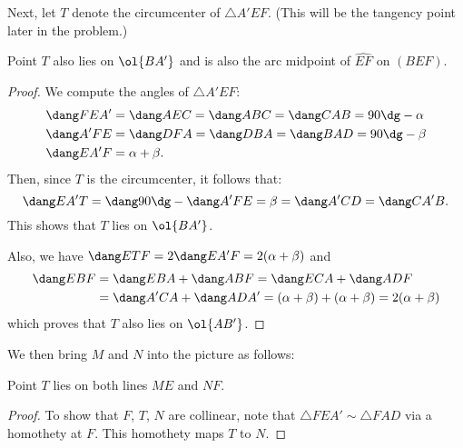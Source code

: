 \documentclass[11pt]{scrartcl}
\begin{document}
Next, let $T$ denote the circumcenter of $\triangle A'EF$.
(This will be the tangency point later in the problem.)
\begin{claim*}
  Point $T$ also lies on $\ol{BA'}$ and is also the arc midpoint of $\widehat{EF}$ on $(BEF)$.
\end{claim*}
\begin{proof}
  We compute the angles of $\triangle A'EF$:
  \begin{align*}
    \dang FEA' &= \dang AEC = \dang ABC = \dang CAB = 90\dg - \alpha \\
    \dang A'FE &= \dang DFA = \dang DBA = \dang BAD = 90\dg - \beta \\
    \dang EA'F &= \alpha + \beta.
  \end{align*}
  Then, since $T$ is the circumcenter, it follows that:
  \[ \dang EA'T = \dang 90\dg - \dang A'FE = \beta = \dang A'CD = \dang CA'B. \]
  This shows that $T$ lies on $\ol{BA'}$.

  Also, we have $\dang ETF = 2 \dang EA'F = 2(\alpha+\beta)$ and
  \begin{align*}
    \dang EBF &= \dang EBA + \dang ABF = \dang ECA + \dang ADF \\
    &= \dang A'CA + \dang ADA' = (\alpha+\beta) + (\alpha+\beta) = 2(\alpha+\beta)
  \end{align*}
   which proves that $T$ also lies on $\ol{AB'}$.
\end{proof}

We then bring $M$ and $N$ into the picture as follows:
\begin{claim*}
  Point $T$ lies on both lines $ME$ and $NF$.
\end{claim*}
\begin{proof}
  To show that $F$, $T$, $N$ are collinear,
  note that $\triangle FEA' \sim \triangle FAD$ via a homothety at $F$.
  This homothety maps $T$ to $N$.
\end{proof}
\end{document}
